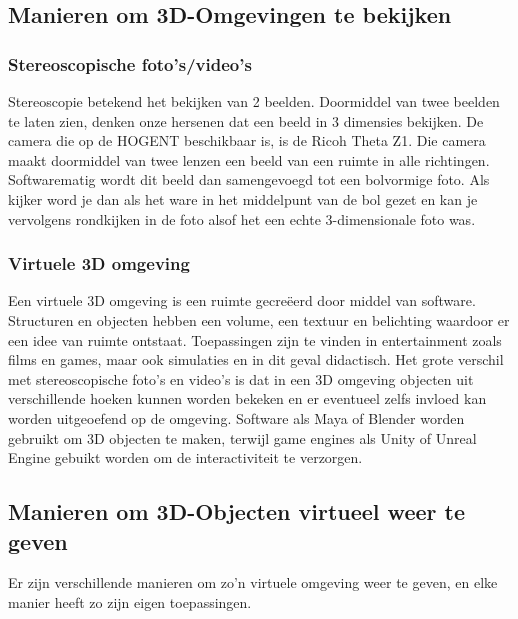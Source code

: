 \documentclass{hogent-article}
\begin{document}


\subsection{Manieren om 3D-Omgevingen te bekijken}
\subsubsection{Stereoscopische foto’s/video’s }

Stereoscopie betekend het bekijken van 2 beelden. Doormiddel van twee beelden te laten zien, denken onze hersenen dat een beeld in 3 dimensies bekijken. De camera die op de HOGENT beschikbaar is, is de Ricoh Theta Z1. Die camera maakt doormiddel van twee lenzen een beeld van een ruimte in alle richtingen. Softwarematig wordt dit beeld dan samengevoegd tot een bolvormige foto. Als kijker word je dan als het ware in het middelpunt van de bol gezet en kan je vervolgens rondkijken in de foto alsof het een echte 3-dimensionale foto was. 

\subsubsection{Virtuele 3D omgeving}

Een virtuele 3D omgeving is een ruimte gecreëerd door middel van software. Structuren en objecten hebben een volume, een textuur en belichting waardoor er een idee van ruimte ontstaat. Toepassingen zijn te vinden in entertainment zoals films en games, maar ook simulaties en in dit geval didactisch. Het grote verschil met stereoscopische foto’s en video’s is dat in een 3D omgeving objecten uit verschillende hoeken kunnen worden bekeken en er eventueel zelfs invloed kan worden uitgeoefend op de omgeving. Software als Maya of Blender worden gebruikt om 3D objecten te maken, terwijl game engines als Unity of Unreal Engine gebuikt worden om de interactiviteit te verzorgen. 

\subsection{Manieren om 3D-Objecten virtueel weer te geven}

Er zijn verschillende manieren om zo’n virtuele omgeving weer te geven, en elke manier heeft zo zijn eigen toepassingen. 
\end{document}
